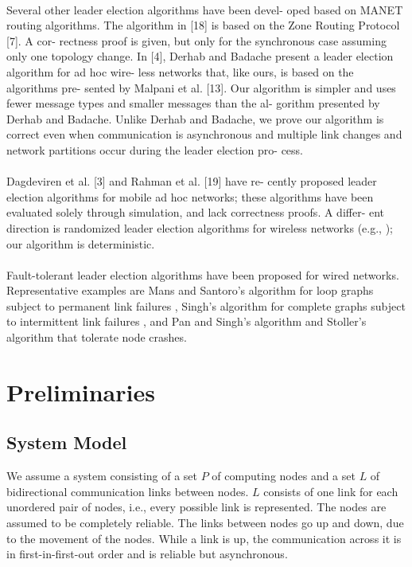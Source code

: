 \documentclass{article}
\begin{document}
\paragraph{}Several other leader election algorithms have been devel-
oped based on MANET routing algorithms. The algorithm
in [18] is based on the Zone Routing Protocol [7]. A cor-
rectness proof is given, but only for the synchronous case
assuming only one topology change. In [4], Derhab and
Badache present a leader election algorithm for ad hoc wire-
less networks that, like ours, is based on the algorithms pre-
sented by Malpani et al. [13]. Our algorithm is simpler and
uses fewer message types and smaller messages than the al-
gorithm presented by Derhab and Badache. Unlike Derhab
and Badache, we prove our algorithm is correct even when
communication is asynchronous and multiple link changes
and network partitions occur during the leader election pro-
cess.

\paragraph{}Dagdeviren et al. [3] and Rahman et al. [19] have re-
cently proposed leader election algorithms for mobile ad
hoc networks; these algorithms have been evaluated solely
through simulation, and lack correctness proofs. A differ-
ent direction is randomized leader election algorithms for
wireless networks (e.g., \cite{1}); our algorithm is deterministic.

\paragraph{}Fault-tolerant leader election algorithms have been proposed for wired networks. Representative examples are Mans and Santoro’s algorithm for loop graphs subject to permanent link failures \cite{14}, Singh’s algorithm for complete graphs subject to intermittent link failures \cite{20}, and Pan and Singh’s algorithm \cite{16} and Stoller’s algorithm \cite{21} that tolerate node crashes.

\section{Preliminaries}

\subsection{System Model}
We assume a system consisting of a set $P$ of computing nodes and a set $L$ of bidirectional communication links between nodes. $L$ consists of one link for each unordered pair of nodes, i.e., every possible link is represented. The nodes are assumed to be completely reliable. The links between nodes go up and down, due to the movement of the nodes. While a link is up, the communication across it is in first-in-first-out order and is reliable but asynchronous.
\end{document}
